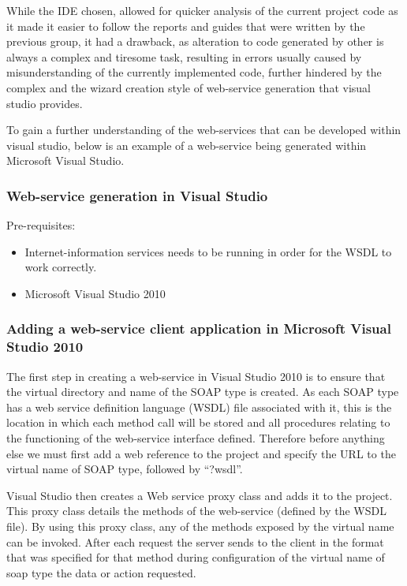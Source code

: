 While the IDE chosen, allowed for quicker analysis of the current project code as it made it easier to follow the reports and guides that were written by the previous group, it had a drawback, as alteration to code generated by other is always a complex and tiresome task, resulting in errors usually caused by misunderstanding of the currently implemented code, further hindered by the complex and the wizard creation style of web-service generation that visual studio provides.

To gain a further understanding of the web-services that can be developed within visual studio, below is an example of a web-service being generated within Microsoft Visual Studio.

\subsubsection{Web-service generation in Visual Studio}

Pre-requisites:
\begin{itemize}
	\item Internet-information services needs to be running in order for the WSDL to work correctly.
	
	\item Microsoft Visual Studio 2010
\end{itemize}

\subsubsection{Adding a web-service client application in Microsoft Visual Studio 2010}
The first step in creating a web-service in Visual Studio 2010 is to ensure that  the virtual directory and name of the SOAP type is created. As each SOAP type has a web service definition language (WSDL) file associated with it, this is the location in which each method call will be stored and all procedures relating to the functioning of the web-service interface defined. 
Therefore before anything else we must first add a web reference to the project and specify the URL to the virtual name of SOAP type, followed by ``?wsdl''. 

Visual Studio then creates a Web service proxy class and adds it to the project. This proxy class details the methods of the web-service (defined by the WSDL file). By using this proxy class, any of the methods exposed by the virtual name can be invoked. After each request the server sends to the client in the format that was specified for that method during configuration of the virtual name of soap type the data or action requested.

